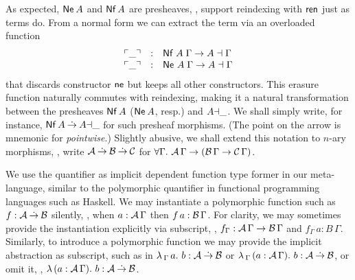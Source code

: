\documentclass[sigplan,screen,fleqn,review]{acmart} %
\begin{document}
As expected, $\mathsf{Ne}^{}\,A$ and $\mathsf{Nf}\,A$ are presheaves,
\ie, support reindexing with $\mathsf{ren}$ just as terms do.
From a normal form we can extract the term via an overloaded function
\[
\begin{array}{lcl}
\ulcorner\_\urcorner & : & \mathsf{Nf}\;A\;\Gamma \to A \dashv \Gamma \\
\ulcorner\_\urcorner & : & \mathsf{Ne}^{}\;A\;\Gamma \to A \dashv \Gamma \\
\end{array}
\]
that discards constructor $\mathsf{ne}$ but keeps all other constructors.
This erasure function naturally commutes with reindexing, making it a
natural transformation between the presheaves $\mathsf{Nf}\,A$ ($\mathsf{Ne}^{}\,A$,
resp.) and $A{\dashv}\_$.  We shall simply write, for instance,
$\mathsf{Nf}\,A \mathbin{\dot{\to}} A{\dashv}\_$ for such presheaf morphisms.
(The point on the arrow is mnemonic for \emph{pointwise}.)
Slightly abusive, we shall extend this notation to $n$-ary
morphisms, \eg, write $\mathcal{A} \mathbin{\dot{\to}} \mathcal{B} \mathbin{\dot{\to}} \mathcal{C}$ for
$\forall \Gamma.\ \mathcal{A}\,\Gamma \to (\mathcal{B}\,\Gamma \to \mathcal{C}\,\Gamma)$.

We use the \fbox{$\forall$} quantifier as implicit dependent function
type former in our meta-language,
similar to the polymorphic quantifier in functional
programming languages such as Haskell.  We may instantiate a
polymorphic function such as $f : \mathcal{A} \mathbin{\dot{\to}} \mathcal{B}$ silently, \eg, when $a
: \mathcal{A}\,\Gamma$ then $f\,a : \mathcal{B}\,\Gamma$.  For clarity, we may sometimes
provide the instantiation explicitly via subscript, \eg, $f_\Gamma :
\mathcal{A}\,\Gamma \to \mathcal{B}\,\Gamma$ and $f_\Gamma\,a : B\,\Gamma$.  Similarly,
to introduce a polymorphic function we may provide the implicit
abstraction as subscript, such as in
$\lambda\,{}_\Gamma\, a.\ b : \mathcal{A} \mathbin{\dot{\to}} \mathcal{B}$ or
$\lambda\,{}_\Gamma\, (a : \mathcal{A}\,\Gamma).\ b : \mathcal{A} \mathbin{\dot{\to}} \mathcal{B}$, or
omit it, \eg,
$\lambda\,(a : \mathcal{A}\,\Gamma).\ b : \mathcal{A} \mathbin{\dot{\to}} \mathcal{B}$.
\end{document}
